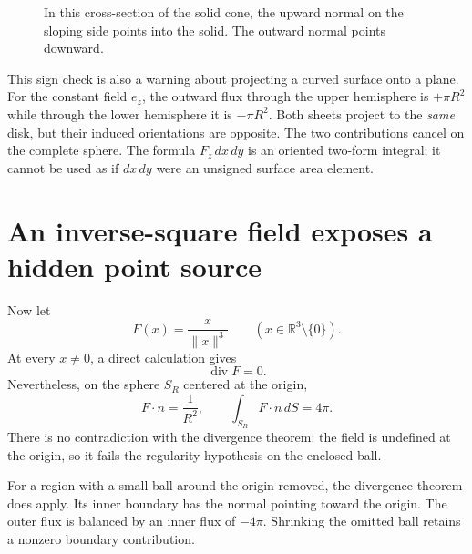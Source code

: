 \begin{figure}[H]
\centering
{}
\caption{In this cross-section of the solid cone, the upward normal on the sloping side points into the solid. The outward normal points downward.}
\end{figure}

This sign check is also a warning about projecting a curved surface onto a plane. For the constant field $e_z$, the outward flux through the upper hemisphere is $+\pi R^2$ while through the lower hemisphere it is $-\pi R^2$. Both sheets project to the \emph{same} disk, but their induced orientations are opposite. The two contributions cancel on the complete sphere. The formula $F_z\,dx\,dy$ is an oriented two-form integral; it cannot be used as if $dx\,dy$ were an unsigned surface area element.

\section{An inverse-square field exposes a hidden point source}

Now let
\[
 F(x)=\frac{x}{\|x\|^3}\qquad(x\in\mathbb R^3\setminus\{0\}).
\]
At every \(x\ne0\), a direct calculation gives
\[
 \operatorname{div}F=0.
\]
Nevertheless, on the sphere \(S_R\) centered at the origin,
\[
 F\cdot n=\frac1{R^2},\qquad
 \boxed{\int_{S_R}F\cdot n\,dS=4\pi.}
\]
There is no contradiction with the divergence theorem: the field is undefined at the origin, so it fails the regularity hypothesis on the enclosed ball.

For a region with a small ball around the origin removed, the divergence theorem does apply. Its inner boundary has the normal pointing toward the origin. The outer flux is balanced by an inner flux of \(-4\pi\). Shrinking the omitted ball retains a nonzero boundary contribution.

